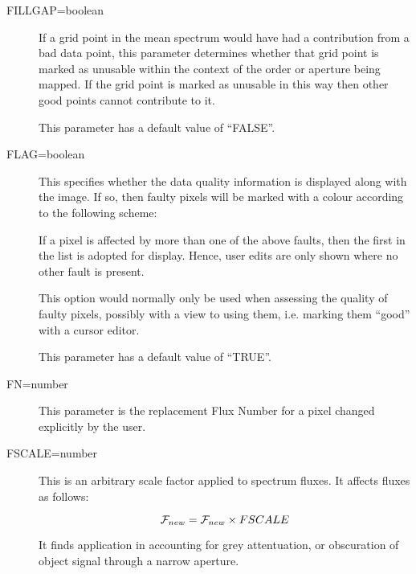\begin {description}
\item [FILLGAP=boolean]
If a grid point in the mean spectrum would have had a contribution
from a bad data point, this parameter determines whether that
grid point is marked as unusable within the context
of the order or aperture being mapped.
If the grid point is marked as unusable in this way then other
good points cannot contribute to it.

This parameter has a default value of ``FALSE''.

\item [FLAG=boolean]
This specifies whether the data quality information is displayed
along with the image.
If so, then faulty pixels will be marked with a colour according to
the following scheme:

\begin {quote}
\end {quote}

If a pixel is affected by more than one of the above faults, then
the first in the list is adopted for display.
Hence, user edits are only shown where no other fault is present.

This option would normally only be used when assessing the quality
of faulty pixels, possibly with a view to using them, i.e. marking them
``good'' with a cursor editor.

This parameter has a default value of ``TRUE''.

\item [FN=number]
This parameter is the replacement Flux Number for a pixel changed
explicitly by the user.

\item [FSCALE=number]
This is an arbitrary scale factor applied to spectrum fluxes.
It affects fluxes as follows:

\begin {equation}
{\cal F}_{new} = {\cal F}_{new} \times FSCALE
\end {equation}

It finds application in accounting for grey attentuation, or obscuration
of object signal through a narrow aperture.


\end{description}
